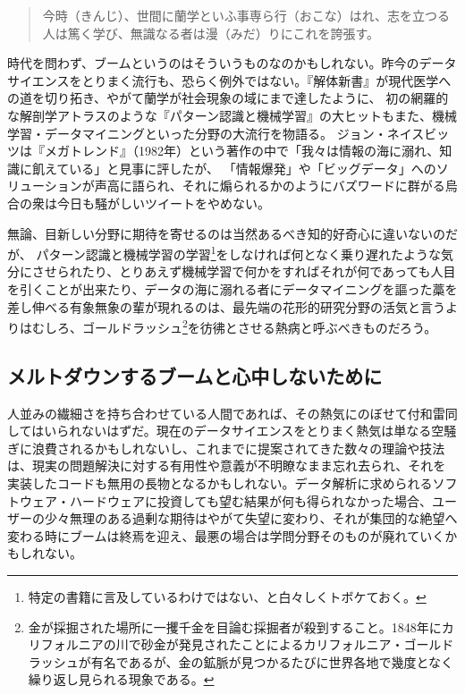 \begin{quote}
今時（きんじ）、世間に蘭学といふ事専ら行（おこな）はれ、志を立つる人は篤く学び、無識なる者は漫（みだ）りにこれを誇張す。
\end{quote}

時代を問わず、ブームというのはそういうものなのかもしれない。昨今のデータサイエンスをとりまく流行も、恐らく例外ではない。『解体新書』が現代医学への道を切り拓き、やがて蘭学が社会現象の域にまで達したように、
初の網羅的な解剖学アトラスのような『パターン認識と機械学習』の大ヒットもまた、機械学習・データマイニングといった分野の大流行を物語る。
ジョン・ネイスビッツは『メガトレンド』（1982年）という著作の中で「我々は情報の海に溺れ、知識に飢えている」と見事に評したが、
「情報爆発」や「ビッグデータ」へのソリューションが声高に語られ、それに煽られるかのようにバズワードに群がる烏合の衆は今日も騒がしいツイートをやめない。

無論、目新しい分野に期待を寄せるのは当然あるべき知的好奇心に違いないのだが、
パターン認識と機械学習の学習\footnote{特定の書籍に言及しているわけではない、と白々しくトボケておく。}をしなければ何となく乗り遅れたような気分にさせられたり、とりあえず機械学習で何かをすればそれが何であっても人目を引くことが出来たり、データの海に溺れる者にデータマイニングを謳った藁を差し伸べる有象無象の輩が現れるのは、最先端の花形的研究分野の活気と言うよりはむしろ、ゴールドラッシュ\footnote{金が採掘された場所に一攫千金を目論む採掘者が殺到すること。1848年にカリフォルニアの川で砂金が発見されたことによるカリフォルニア・ゴールドラッシュが有名であるが、金の鉱脈が見つかるたびに世界各地で幾度となく繰り返し見られる現象である。}を彷彿とさせる熱病と呼ぶべきものだろう。

\subsection{メルトダウンするブームと心中しないために}
人並みの繊細さを持ち合わせている人間であれば、その熱気にのぼせて付和雷同してはいられないはずだ。現在のデータサイエンスをとりまく熱気は単なる空騒ぎに浪費されるかもしれないし、これまでに提案されてきた数々の理論や技法は、現実の問題解決に対する有用性や意義が不明瞭なまま忘れ去られ、それを実装したコードも無用の長物となるかもしれない。データ解析に求められるソフトウェア・ハードウェアに投資しても望む結果が何も得られなかった場合、ユーザーの少々無理のある過剰な期待はやがて失望に変わり、それが集団的な絶望へ変わる時にブームは終焉を迎え、最悪の場合は学問分野そのものが廃れていくかもしれない。

